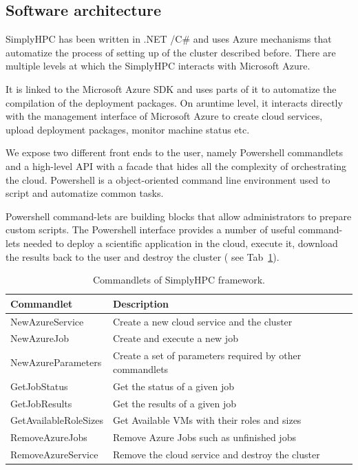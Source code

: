 \documentclass[3p,times]{elsarticle}
\begin{document}
\subsection{Software architecture}

SimplyHPC has been written in .NET  /C\# and uses Azure mechanisms that automatize the process of setting up of the cluster described before. There are multiple levels at which the SimplyHPC interacts with Microsoft Azure.

It is linked to the Microsoft Azure SDK and uses parts of it to automatize the compilation of the deployment packages. On aruntime level, it interacts directly with the management interface of Microsoft Azure to create cloud services, upload deployment packages, monitor machine status etc.


We expose two different front ends to the user, namely Powershell commandlets and a high-level API with a facade that hides all the complexity of orchestrating the cloud.  Powershell is a object-oriented command line environment used to script and automatize common tasks.

Powershell command-lets are building blocks that allow administrators to prepare custom scripts. The Powershell interface provides a number of useful command-lets needed to deploy a scientific application in the cloud, execute it, download the results back to the user and destroy the cluster ( see Tab~\ref{tab:CommandletsOfSimplyHPC}). 

\begin{table}
	\centering		
		\begin{tabular}{|l|l|}
		\hline
      \textbf{Commandlet} & \textbf{Description} \\ \hline
      NewAzureService & Create a new cloud service and the cluster \\ \hline
			NewAzureJob & Create and execute a new job \\ \hline
			NewAzureParameters & Create a set of parameters required by other commandlets    \\ \hline
			GetJobStatus & Get the status of a given job    \\ \hline
			GetJobResults & Get the results of a given job  \\ \hline
			GetAvailableRoleSizes & Get Available VMs with their roles and sizes \\ \hline
			RemoveAzureJobs & Remove Azure Jobs such as unfinished jobs \\ \hline
			RemoveAzureService & Remove the cloud service and destroy the cluster \\ \hline
    \end{tabular}
	\caption{Commandlets of SimplyHPC framework.}
	\label{tab:CommandletsOfSimplyHPC}
\end{table}
\end{document}
